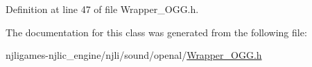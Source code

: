Definition at line 47 of file Wrapper\+\_\+\+O\+G\+G.\+h.



The documentation for this class was generated from the following file\+:\begin{DoxyCompactItemize}
\item 
njligames-\/njlic\+\_\+engine/njli/sound/openal/\mbox{\hyperlink{_wrapper___o_g_g_8h}{Wrapper\+\_\+\+O\+G\+G.\+h}}\end{DoxyCompactItemize}
